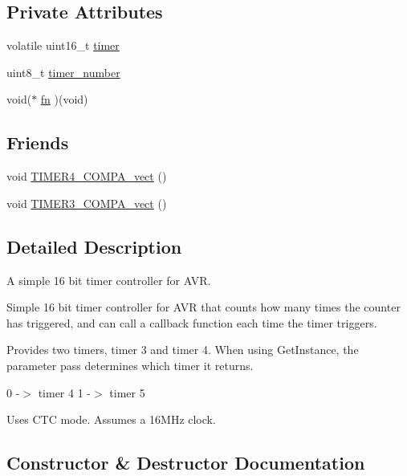\subsection*{Private Attributes}
\begin{DoxyCompactItemize}
\item 
volatile uint16\+\_\+t \hyperlink{class_timer_abd1196c7069c046e192e936bfc264693}{timer}
\item 
uint8\+\_\+t \hyperlink{class_timer_a3c813be60ee224a8d6b252a83dfe16d3}{timer\+\_\+number}
\item 
void($\ast$ \hyperlink{class_timer_af44fd5c977c119c25af6aeee6f7cdc7a}{fn} )(void)
\end{DoxyCompactItemize}
\subsection*{Friends}
\begin{DoxyCompactItemize}
\item 
void \hyperlink{class_timer_a53c4be4b5bb54690ef9012fde8d97b9c}{T\+I\+M\+E\+R4\+\_\+\+C\+O\+M\+P\+A\+\_\+vect} ()
\item 
void \hyperlink{class_timer_a7aadba5fdadb4c3e5483845e75cdf5a1}{T\+I\+M\+E\+R3\+\_\+\+C\+O\+M\+P\+A\+\_\+vect} ()
\end{DoxyCompactItemize}


\subsection{Detailed Description}
A simple 16 bit timer controller for A\+VR. 

Simple 16 bit timer controller for A\+VR that counts how many times the counter has triggered, and can call a callback function each time the timer triggers.

Provides two timers, timer 3 and timer 4. When using Get\+Instance, the parameter pass determines which timer it returns.

0 -\/$>$ timer 4 1 -\/$>$ timer 5

Uses C\+TC mode. Assumes a 16\+M\+Hz clock. 

\subsection{Constructor \& Destructor Documentation}
\hypertarget{class_timer_ae6b73141ad1d5029d3782d14d2fd5ff0}{}\label{class_timer_ae6b73141ad1d5029d3782d14d2fd5ff0} 
